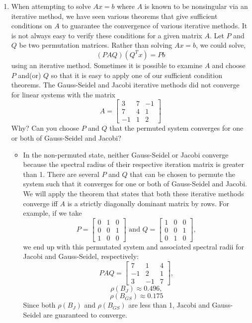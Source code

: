 \documentclass[10pt]{article}
\begin{document}
\begin{enumerate}
\item When attempting to solve $Ax = b$ where $A$ is known to be nonsingular via an iterative method, we have seen various theorems that give sufficient conditions on $A$ to guarantee the convergence of various iterative methods. It is not always easy to verify these conditions for a given matrix $A$. Let $P$ and $Q$ be two permutation matrices. Rather than solving $Ax = b$, we could solve,
	$$ (PAQ)(Q^{T}x) = Pb $$
	using an iterative method. Sometimes it is possible to examine $A$ and choose $P$ and(or) $Q$ so that it is easy to apply one of our sufficient condition theorems. The Gauss-Seidel and Jacobi iterative methods did not converge for linear systems with the matrix
	$$A =
	\begin{bmatrix} 
	3 & 7 & -1 \\
	7 & 4 & 1 \\
	-1 & 1 & 2
	\end{bmatrix}
	$$
	Why? Can you choose $P$ and $Q$ that the permuted system converges for one or both of Gauss-Seidel and Jacobi?
	\begin{itemize}
		\item In the non-permuted state, neither Gauss-Seidel or Jacobi converge because the spectral radius of their respective iteration matrix is greater than 1. There are several $P$ and $Q$ that can be chosen to permute the system such that it converges for one or both of Gauss-Seidel and Jacobi. We will apply the theorem that states that both these iterative methods converge iff $A$ is a strictly diagonally dominant matrix by rows. For example, if we take 
	$$ P = \begin{bmatrix} 
		 0 & 1 & 0 \\ 
		 0 & 0 & 1 \\
		 1 & 0 & 0 \end{bmatrix} 
	\mbox{ and }
	Q = \begin{bmatrix} 
		 1 & 0 & 0 \\
		 0 & 0 & 1 \\
		 0 & 1 & 0 \end{bmatrix}, $$
	we end up with this permutated system and associated spectral radii for Jacobi and Gauss-Seidel, respectively:
	$$ PAQ = \begin{bmatrix} 
		 7 & 1 & 4 \\ 
		 -1 & 2 & 1 \\
		 3 & -1 & 7 \end{bmatrix}, $$
	$$\rho(B_J) \approx 0.496,$$
	$$\rho(B_{GS}) \approx 0.175$$
	Since both $\rho(B_J)$ and $\rho(B_{GS})$ are less than 1, Jacobi and Gauss-Seidel are guaranteed to converge.
	\end{itemize}


\end{enumerate}
\end{document}

